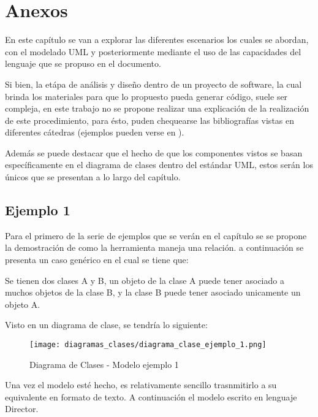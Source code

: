 \chapter{Anexos}
En este capítulo se van a explorar las diferentes escenarios los cuales se
abordan, con el modelado UML y posteriormente mediante el uso de las
capacidades del lenguaje que se propuso en el documento.

Si bien, la etápa de análisis y diseño dentro de un proyecto de software, la
cual brinda los materiales para que lo propuesto pueda generar código, suele
ser compleja, en este trabajo no se propone realizar una explicación de la
realización de este procedimiento, para ésto, puden chequearse las
bibliografías vistas en diferentes cátedras
(ejemplos pueden verse en \cites{larman2004}{dennis2012}{dathan2015}{satzinger2012}{larman2003}).

Además se puede destacar que el hecho de que los componentes vistos se basan
específicamente en el diagrama de clases dentro del estándar UML, estos serán
los únicos que se presentan a lo largo del capítulo.

\section{Ejemplo 1}
\label{sec:ej1}
Para el primero de la serie de ejemplos que se verán en el capítulo se se
propone la demostración de como la herramienta maneja una relación. a
continuación se presenta un caso genérico en el cual se tiene que:

\begin{displayquote}
	Se tienen dos clases A y B, un objeto de la clase A puede tener asociado a
	muchos objetos de la clase B, y la clase B puede tener asociado unicamente un
	objeto A.
\end{displayquote}

Visto en un diagrama de clase, se tendría lo siguiente:

\begin{figure}[H]
	\centering
	\texttt{[image: diagramas\_clases/diagrama\_clase\_ejemplo\_1.png]}
	\caption{Diagrama de Clases - Modelo ejemplo 1}
	\label{fig:dc_mod_ej_1}
\end{figure}

Una vez el modelo esté hecho, es relativamente sencillo trasnmitirlo a su
equivalente en formato de texto. A continuación el modelo escrito en lenguaje
Director.



